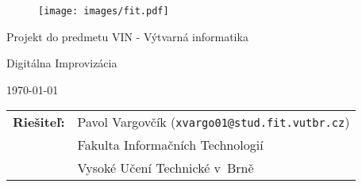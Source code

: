 \begin{titlepage}

\vspace*{1cm}

\begin{figure}
  \centering
  \texttt{[image: images/fit.pdf]}
\end{figure}

\vspace*{5mm}

\begin{center}
\begin{Large}
Projekt do predmetu VIN - Výtvarná informatika
\end{Large}
\end{center}

\vspace*{5mm}

\begin{center}
\begin{Huge}
Digitálna Improvizácia
\end{Huge}
\end{center}

\vspace*{1cm}

\begin{center}
\begin{Large}
\today
\end{Large}
\end{center}

\vfill

\begin{flushleft}
\begin{large}
\begin{tabular}{ll}

\bf Riešiteľ:\hspace{3mm} & Pavol Vargovčík (\verb_xvargo01@stud.fit.vutbr.cz_) \\
& Fakulta Informačních Technologií \\
& Vysoké Učení Technické v~Brně

\end{tabular}
\end{large}
\end{flushleft}

\end{titlepage}

